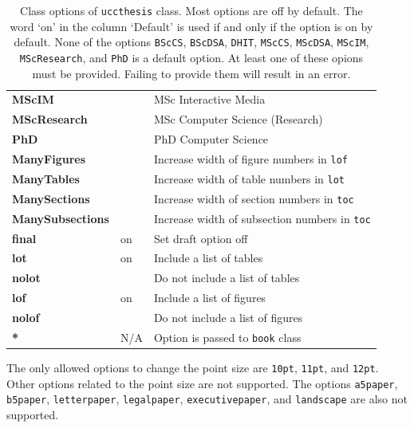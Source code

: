 \documentclass[MScCS]{uccthesis}
\begin{document}
\begin{table}[tbp]
\begin{tabular}{lll}
      \\\textbf{MScIM}    &     & MSc Interactive Media
      \\\textbf{MScResearch} &  & MSc Computer Science (Research)
      \\\textbf{PhD}      &     & PhD Computer Science
      \\\midrule
        \textbf{ManyFigures}   &    & Increase width of figure numbers in \texttt{lof}
      \\\textbf{ManyTables}    &    & Increase width of table numbers in \texttt{lot}
      \\\textbf{ManySections}  &    & Increase width of section numbers in \texttt{toc}
      \\\textbf{ManySubsections}&    & Increase width of subsection numbers in \texttt{toc}
      \\\textbf{final}    & on  & Set draft option off
      \\\textbf{lot}      & on  & Include a list of tables
      \\\textbf{nolot}    &     & Do not include a list of tables
      \\\textbf{lof}      & on  & Include a list of figures
      \\\textbf{nolof}    &     & Do not include a list of figures
      \\\textbf{*}        & N/A & Option is passed to \texttt{book} class
      \\\bottomrule
      \end{tabular}
      \caption[Class options of \protect\texttt{uccthesis} class.]
              {\label{tab:options}Class options of \protect\texttt{uccthesis} class.
               Most options are off by default.
               The word `on' in the column `Default' is used
                if and only if the option is on by default.
               None of the options
                \texttt{BScCS}, \texttt{BScDSA}, \texttt{DHIT},
                \texttt{MScCS}, \texttt{MScDSA}, \texttt{MScIM}, \texttt{MScResearch}, and
                \texttt{PhD}
                is a default option.
               At least one of these opions must be provided.
               Failing to provide them will result in an error.}
      \end{table}
      The only allowed options to change the point size are
       \texttt{10pt},
       \texttt{11pt}, and
       \texttt{12pt}.
      Other options related to the point size are not supported.
      The options
       \texttt{a5paper},
       \texttt{b5paper},
       \texttt{letterpaper},
       \texttt{legalpaper},
       \texttt{executivepaper}, and
       \texttt{landscape}
       are also not supported.
\end{document}
